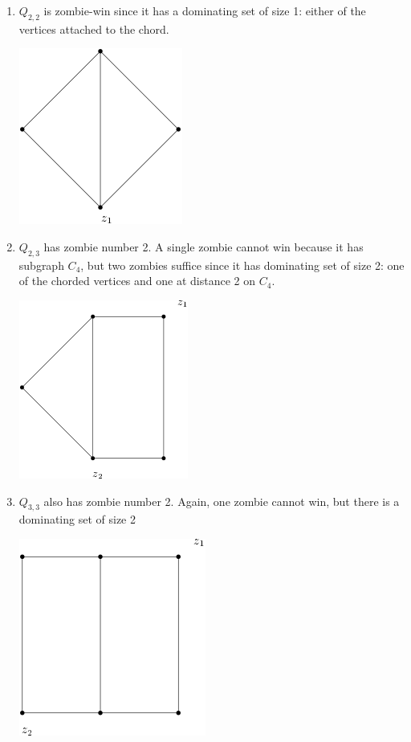\documentclass[letterpaper, 10pt]{article}
\begin{document}
\begin{enumerate}
\item $Q_{2,2}$ is zombie-win since it has a dominating set of size 1: either of
the vertices attached to the chord.

\begin{center}
  \includegraphics[scale=0.35]{Q_2,2}
\end{center}

\item $Q_{2,3}$ has zombie number 2. A single zombie cannot win because it has subgraph $C_4$,
but two zombies suffice since it has dominating set of size 2:
one of the chorded vertices and one at distance 2 on $C_4$.

\begin{center}
  \includegraphics[scale=0.35]{Q_2,3}
\end{center}

\item $Q_{3,3}$ also has zombie number 2. Again, one zombie cannot win, but there is a dominating set of size 2

\begin{center}
  \includegraphics[scale=0.35]{Q_3,3}
\end{center}


\end{enumerate}
\end{document}
